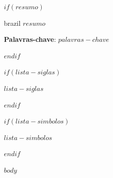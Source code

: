 \documentclass[
12pt,
openright,
oneside,
a4paper,
brazilian,
sumario=tradicional
]{abntex2}
\newcommand{\imprimirprimeirafolha}{%
\begin{center}
\vspace*{2cm}
{\ABNTEXchapterfont\large\MakeUppercase{\imprimirautor}}

\vspace*{3cm}

{\ABNTEXchapterfont\bfseries\LARGE\imprimirtitulo}

\vfill

{\large\imprimirlocal}

\vspace*{0.5cm}

{\large\imprimirdata}

\vspace*{2cm}
\end{center}
\clearpage
}
\begin{document}

\pretextual

\imprimirprimeirafolha

$if(resumo)$
\begin{resumo}[Resumo]
\begin{otherlanguage*}{brazil}
$resumo$

\textbf{Palavras-chave}: $palavras-chave$
\end{otherlanguage*}
\end{resumo}
$endif$

\listoffigures*
\cleardoublepage

\listoftables*
\cleardoublepage

$if(lista-siglas)$
\begin{siglas}
$lista-siglas$
\end{siglas}
$endif$

$if(lista-simbolos)$
\begin{simbolos}
$lista-simbolos$
\end{simbolos}
$endif$

\tableofcontents*
\cleardoublepage

\textual

$body$
\end{document}
